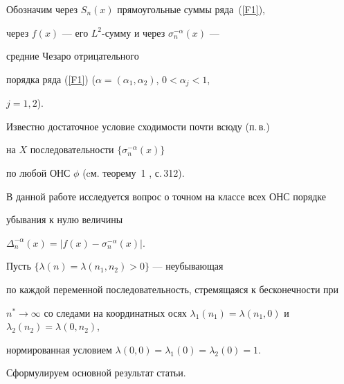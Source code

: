 Обозначим через $S_n(x)$ прямоугольные суммы ряда~(\ref{F1}),


через $f(x)$ --- его $L^2$-сумму и через $\sigma_n^{-\alpha }(x)$ ---


средние Чезаро отрицательного


порядка ряда (\ref{F1}) ($\alpha =(\alpha_1, \alpha_2)$, $0<\alpha_j<1$,


$j=1,2$).





Известно достаточное условие сходимости почти всюду (п.\,в.)


на $X$ последовательности $\{\sigma_n^{-\alpha } (x) \}$


по любой ОНС $\phi $ (cм. теорему~1 \cite{l1}, с.\,312).





В данной работе исследуется вопрос о точном на классе всех ОНС порядке 


убывания к нулю величины


$\Delta_n^{-\alpha}(x)= |f(x)-\sigma_n^{-\alpha }(x) |$.





Пусть $\{ \lambda(n)=\lambda (n_1,n_2) >0\}$ --- неубывающая


по каждой переменной последовательность, стремящаяся к бесконечности при


$ n^*\to \infty$ со следами на координатных осях $\lambda_1(n_1)=\lambda


(n_1,0)$ и $\lambda_2(n_2)=\lambda (0,n_2)$,


нормированная условием $\lambda (0,0)=\lambda_1(0)=\lambda_2(0)=1$.





Сформулируем основной результат статьи.





